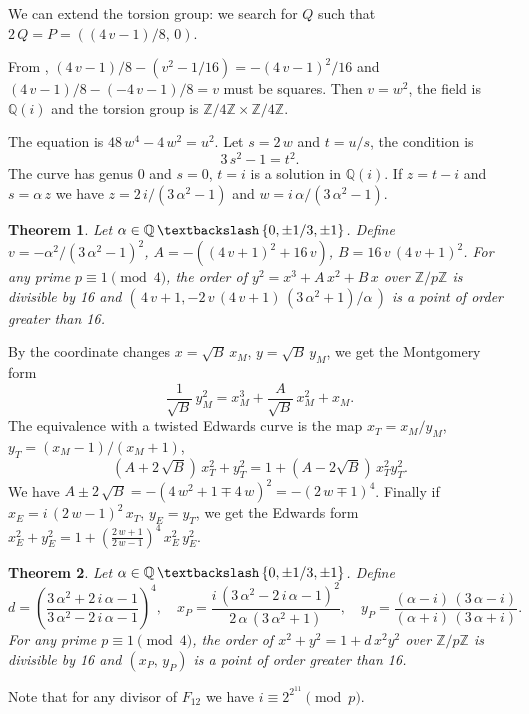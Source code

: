 \documentclass[a4paper, 11pt, pdftex]{report}
\theoremstyle{plain}
\newtheorem{theorem}{Theorem}[chapter]
\theoremstyle{definition}
\begin{document}
We can extend the torsion group: we search for $Q$ such that $2\,Q = P = ((4\,v - 1)/8,\, 0)$.

From \cite[Theorem 4.2]{Knapp1}, $(4\,v - 1)/8 - (v^2 - 1/16) = -(4\,v - 1)^2 / 16$ and
$(4\,v - 1)/8 - (-4\,v - 1)/8 = v$ must be squares. Then $v = w^2$, the field is
$\mathbb{Q}(i)$ and the torsion group is $\mathbb{Z}/4\mathbb{Z} \times \mathbb{Z}/4\mathbb{Z}$.

The equation is $48\,w^4 - 4\,w^2 = u^2$. Let $s = 2\,w$ and $t = u / s$, the condition is
$$3\,s^2 - 1 = t^2.$$
The curve has genus 0 and $s = 0$, $t = i$ is a solution in $\mathbb{Q}(i)$. If $z = t - i$
and $s = \alpha\,z$ we have $z = 2\,i / (3\,\alpha^2 - 1)$ and $w = i\, \alpha / (3\,\alpha^2 - 1)$.

\begin{theorem}
Let $\alpha \in \mathbb{Q}\, \textbackslash \, \{0, \pm1/3, \pm1\}$.
Define $v = -\alpha^2 / (3\,\alpha^2 - 1)^2$, $A = -((4\,v+1)^2 + 16\,v)$,
$B = 16\,v\,(4\,v + 1)^2$. For any prime $p \equiv 1 \pmod{4}$,
the order of $y^2 = x^3 + A\, x^2 + B\, x$ over $\mathbb{Z}/p\mathbb{Z}$ is divisible by 16
and $(\,4\,v + 1, - 2\,v\,(4\,v + 1)\,(3\,\alpha^2 + 1)/\alpha\,)$ is a point of order
greater than 16.
\end{theorem}

By the coordinate changes $x = \sqrt{B}\,x_M$, $y = \sqrt{B}\,y_M$, we get the Montgomery form
$$\frac{1}{\sqrt{B}}\, y_M^2 = x_M^3 + \frac{A}{\sqrt{B}}\, x_M^2 + x_M.$$
The equivalence with a twisted Edwards curve is the map $x_T = x_M / y_M$,
$y_T = (x_M - 1)/(x_M + 1)$,
$$(A + 2\,\sqrt{B})\,x_T^2 + y_T^2 = 1 + (A - 2\sqrt{B})\,x_T^2y_T^2.$$
We have $A \pm 2\,\sqrt{B} = -(4\,w^2+1 \mp 4\,w)^2
= -(2\,w \mp 1)^4$.
Finally if $x_E = i\,(2\,w - 1)^2\,x_T$, $y_E = y_T$, we get the Edwards form
$x_E^2 + y_E^2 = 1 + \left(\frac{2\,w + 1}{2\,w - 1}\right)^4\,x_E^2\,y_E^2$.

\begin{theorem}
Let $\alpha \in \mathbb{Q}\, \textbackslash \, \{0, \pm1/3, \pm1\}$. Define
$$d = \left( \frac{3\,\alpha^2 + 2\,i\,\alpha - 1}{3\,\alpha^2 - 2\,i\,\alpha -1} \right)^4,\quad
x_P = \frac{i \, (3\,\alpha^2 - 2\,i\,\alpha - 1)^2}{2\, \alpha\, (3\,\alpha^2 + 1)},\quad
y_P = \frac{(\alpha - i)\,(3\,\alpha - i)}{(\alpha + i)\,(3\,\alpha + i)}.$$
For any prime $p \equiv 1 \pmod{4}$, the order of $x^2 + y^2 = 1 + d\,x^2y^2$ over
$\mathbb{Z}/p\mathbb{Z}$ is divisible by 16 and $(x_P,\,y_P)$ is a point of order greater than 16.
\end{theorem}
Note that for any divisor of $F_{12}$ we have $i \equiv 2^{2^{11}} \pmod{p}$.
\end{document}

